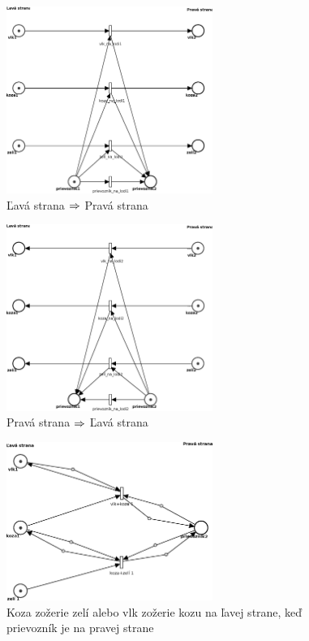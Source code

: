 \documentclass[11pt,a4paper]{article}
\begin{document}
\begin{figure}[H]
    \centering
	\includegraphics[width=0.6\textwidth]{pn1NEW.eps}
    \caption{Ľavá strana $\protect\Rightarrow$ Pravá strana}
    \label{fig:pn1}
\end{figure}

\begin{figure}[H]
    \centering
	\includegraphics[width=0.6\textwidth]{pn2NEW.eps}
    \caption{Pravá strana $\protect\Rightarrow$ Ľavá strana}
    \label{fig:pn2}
\end{figure}

\begin{figure}[H]
    \centering
	\includegraphics[width=0.6\textwidth]{pn3NEW.eps}
    \caption{Koza zožerie zelí alebo vlk zožerie kozu na ľavej strane, keď prievozník je na pravej strane}
    \label{fig:pn3}
\end{figure}
\end{document}
